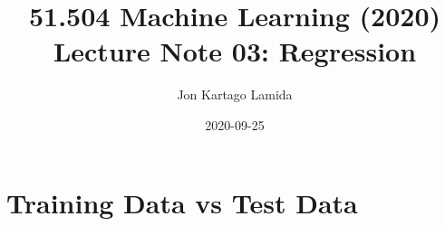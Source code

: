 \documentclass[12pt, a4paper]{article}
\title{%
51.504 Machine Learning (2020) \\
Lecture Note 03: Regression}
\date{2020-09-25}
\author{%
Jon Kartago Lamida}
\begin{document}
  \maketitle
  \setlength{\parindent}{0pt}

\section*{Training Data vs Test Data}
\end{document}
